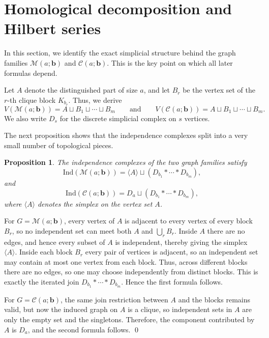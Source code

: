 \documentclass[12pt]{article}
\renewenvironment{proof}{{\bf \noindent Proof.}}{\qed}
\newtheorem{proposition}[theorem]{Proposition}
\theoremstyle{definition}
\theoremstyle{remark}
\newcommand{\MM}{\mathcal{M}}
\newcommand{\CC}{\mathcal{C}}
\newcommand{\ind}{\mathrm{Ind}}
\newcommand{\bk}[1]{\mathbf{#1}}
\begin{document}
	\section{Homological decomposition and Hilbert series}\label{sec:decomp}
	
	In this section, we identify the exact simplicial structure behind the graph families $\MM(a;\bk{b})$ and $\CC(a;\bk{b})$. This is the key point on which all later formulas depend.
	
	Let $A$ denote the distinguished part of size $a$, and let $B_r$ be the vertex set of the $r$-th clique block $K_{b_r}$. Thus, we derive
	$$
	V(\MM(a;\bk{b}))=A\sqcup B_1\sqcup\cdots\sqcup B_m
	\qquad\text{and}\qquad
	V(\CC(a;\bk{b}))=A\sqcup B_1\sqcup\cdots\sqcup B_m.
	$$
	We also write $D_s$ for the discrete simplicial complex on $s$ vertices.
	
	 \medskip The next proposition shows that the independence complexes split into a very small number of topological pieces.
	
	\begin{proposition}\label{prop:decomp}
		The independence complexes of the two graph families satisfy
		$$
		\ind(\MM(a;\bk{b}))=\langle A\rangle \sqcup (D_{b_1} * \cdots * D_{b_m}),
		$$
		and
		$$
		\ind(\CC(a;\bk{b}))=D_a \sqcup (D_{b_1} * \cdots * D_{b_m}),
		$$
		where $\langle A\rangle$ denotes the simplex on the vertex set $A$.
	\end{proposition}
	
	\begin{proof}
		For $G=\MM(a;\bk{b})$, every vertex of $A$ is adjacent to every vertex of every block $B_r$, so no independent set can meet both $A$ and $\bigcup_r B_r$. Inside $A$ there are no edges, and hence every subset of $A$ is independent, thereby giving the simplex $\langle A\rangle$. Inside each block $B_r$ every pair of vertices is adjacent, so an independent set may contain at most one vertex from each block. Thus, across different blocks there are no edges, so one may choose independently from distinct blocks. This is exactly the iterated join $D_{b_1} * \cdots * D_{b_m}$. Hence the first formula follows.
		
		For $G=\CC(a;\bk{b})$, the same join restriction between $A$ and the blocks remains valid, but now the induced graph on $A$ is a clique, so independent sets in $A$ are only the empty set and the singletons. Therefore, the component contributed by $A$ is $D_a$, and the second formula follows.
	\end{proof}
	
\end{document}
